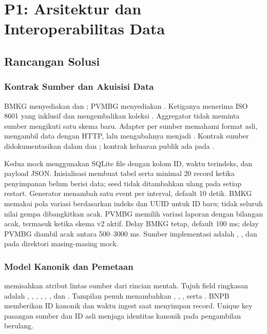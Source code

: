 \chapter[P1: Interoperabilitas Data]{P1: Arsitektur dan Interoperabilitas Data}
\section{Rancangan Solusi}
\subsection{Kontrak Sumber dan Akuisisi Data}
BMKG menyediakan  dan ; PVMBG menyediakan . Ketiganya menerima  ISO 8601 yang inklusif dan mengembalikan koleksi . Aggregator tidak meminta sumber mengikuti satu skema baru. Adapter per sumber memahami format asli, mengambil data dengan HTTP, lalu mengubahnya menjadi . Kontrak sumber didokumentasikan dalam  dan ; kontrak keluaran publik ada pada .

Kedua mock menggunakan SQLite file dengan kolom ID, waktu terindeks, dan payload JSON. Inisialisasi membuat tabel serta minimal 20 record ketika penyimpanan belum berisi data; seed tidak ditambahkan ulang pada setiap restart. Generator menambah satu event per interval, default 10 detik. BMKG memakai pola variasi berdasarkan indeks dan UUID untuk ID baru; tidak seluruh nilai gempa dibangkitkan acak. PVMBG memilih variasi laporan dengan bilangan acak, termasuk  ketika skema v2 aktif. Delay BMKG tetap, default 100 ms; delay PVMBG diambil acak antara 500--3000 ms. Sumber implementasi adalah , , dan  pada direktori masing-masing mock.

\subsection{Model Kanonik dan Pemetaan}
 memisahkan atribut lintas sumber dari rincian mentah. Tujuh field ringkasan adalah , , , , , , dan . Tampilan penuh menambahkan , , , serta . BNPB memberikan ID kanonik dan waktu ingest saat menyimpan record. Unique key pasangan sumber dan ID asli menjaga identitas kanonik pada pengambilan berulang.

